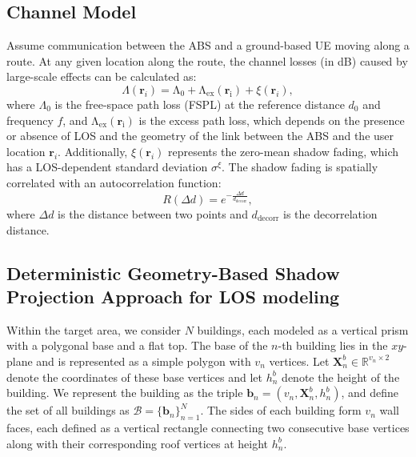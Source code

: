 \documentclass[10pt,conference]{IEEEtran}
\begin{document}
\subsection{Channel Model}
Assume communication between the ABS and a ground-based UE moving along a route. At any given location along the route, the channel losses (in dB) caused by large-scale effects can be calculated as:
\begin{equation}\label{eq:total_channel}
	\Lambda(\mathbf{r}_{i}) = \mathrm{\Lambda_0} + \mathrm{\Lambda_{ex}(\mathbf{r}_{i})} + \xi(\mathbf{r}_{i}),
\end{equation}
where \( \Lambda_0 \) is the free-space path loss (FSPL) at the reference distance \( d_0 \) and frequency \( f \), and \( \mathrm{\Lambda_{ex}(\mathbf{r}_{i})} \) is the excess path loss, which depends on the presence or absence of LOS and the geometry of the link between the ABS and the user location \( \mathbf{r}_i \). Additionally, \( \xi(\mathbf{r}_{i}) \) represents the zero-mean shadow fading, which has a LOS-dependent standard deviation $\sigma^\xi$. The shadow fading is spatially correlated with an autocorrelation function:
\begin{equation}\label{eq:ACF}
	R(\Delta d) = e^{-\frac{\Delta d}{d_{\text{decorr}}}},
\end{equation}
where $\Delta d$ is the distance between two points and $d_{\text{decorr}}$ is the decorrelation distance.

\subsection{Deterministic Geometry-Based Shadow Projection Approach for LOS modeling}\label{sec:gen_geometry}

Within the target area, we consider $N$ buildings, each modeled as a vertical prism with a polygonal base and a flat top. The base of the $n$-th building lies in the $xy$-plane and is represented as a simple polygon with $v_n$ vertices. Let $\mathbf{X}_{n}^b \in \mathbb{R}^{v_{n} \times 2}$ denote the coordinates of these base vertices and let $h_{n}^b$ denote the height of the building. We represent the building as the triple $\mathbf{b}_n = (v_n, \mathbf{X}_{n}^b, h_n^b)$, and define the set of all buildings as $\mathcal{B} = \{ \mathbf{b}_n \}_{n=1}^N$. The sides of each building form $v_n$ {wall faces}, each defined as a vertical rectangle connecting two consecutive base vertices along with their corresponding roof vertices at height $h_n^b$.
\end{document}
